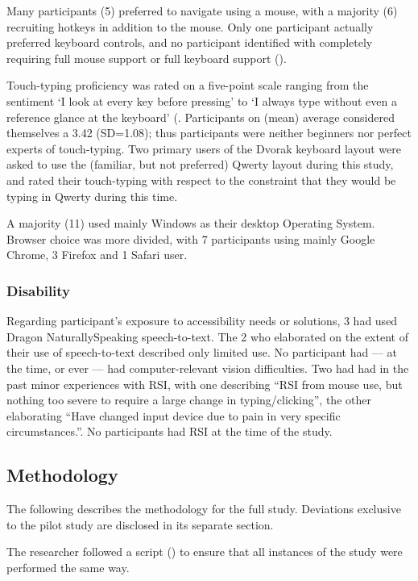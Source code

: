 \documentclass[11pt,openright,a4paper]{report}
\begin{document}
Many participants (5) preferred to navigate using a mouse, with a majority (6) recruiting hotkeys in addition to the mouse. Only one participant actually preferred keyboard controls, and no participant identified with completely requiring full mouse support or full keyboard support ().

Touch-typing proficiency was rated on a five-point scale ranging from the sentiment `I look at every key before pressing' to `I always type without even a reference glance at the keyboard' (. Participants on (mean) average considered themselves a 3.42 (SD=1.08); thus participants were neither beginners nor perfect experts of touch-typing. Two primary users of the Dvorak keyboard layout were asked to use the (familiar, but not preferred) Qwerty layout during this study, and rated their touch-typing with respect to the constraint that they would be typing in Qwerty during this time.

A majority (11) used mainly Windows as their desktop Operating System. Browser choice was more divided, with 7 participants using mainly Google Chrome, 3 Firefox and 1 Safari user.

\subsubsection{Disability}
Regarding participant's exposure to accessibility needs or solutions, 3 had used Dragon NaturallySpeaking speech-to-text. The 2 who elaborated on the extent of their use of speech-to-text described only limited use. No participant had --- at the time, or ever --- had computer-relevant vision difficulties. Two had had in the past minor experiences with RSI, with one describing ``RSI from mouse use, but nothing too severe to require a large change in typing/clicking'', the other elaborating ``Have changed input device due to pain in very specific circumstances.''. No participants had RSI at the time of the study.

\subsection{Methodology}
The following describes the methodology for the full study. Deviations exclusive to the pilot study are disclosed in its separate section.

The researcher followed a script () to ensure that all instances of the study were performed the same way.
\end{document}
